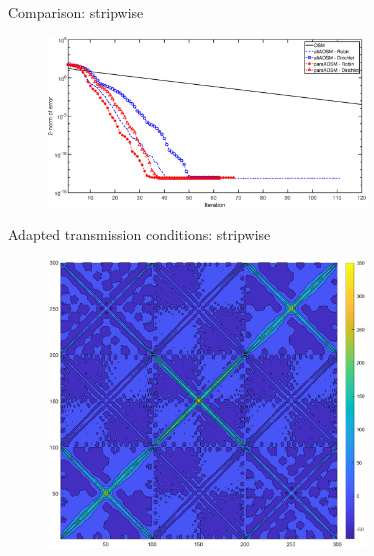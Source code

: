 \documentclass{beamer}
\begin{document}
\begin{frame}{Comparison: stripwise}
\begin{figure}
	\centering
	\includegraphics[width=0.75\textwidth]{AOSM/PLOT_AOSMConv_RedBlack.eps}
\end{figure}
\end{frame}

\begin{frame}{Adapted transmission conditions: stripwise}
\begin{figure}
	\centering
	\includegraphics[width=0.75\textwidth]{AOSM/PLOT_AOSMConv_RedBlack_T.eps}
\end{figure}
\end{frame}
\end{document}
